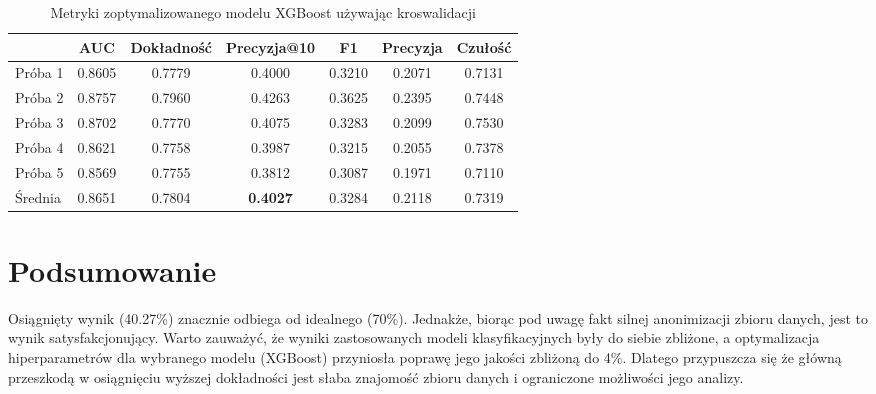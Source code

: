 \documentclass[a4paper,12pt]{article}
\begin{document}

    \begin{table}
        \hspace*{1cm}
        \begin{tabular}{l|*{6}{c}}
            & AUC & Dokładność & Precyzja@10 & F1 & Precyzja & Czułość \\
            \hline
            Próba 1 & 0.8605 & 0.7779 & 0.4000 & 0.3210 & 0.2071 & 0.7131 \\
            Próba 2 & 0.8757 & 0.7960 & 0.4263 & 0.3625 & 0.2395 & 0.7448 \\
            Próba 3 & 0.8702 & 0.7770 & 0.4075 & 0.3283 & 0.2099 & 0.7530 \\
            Próba 4 & 0.8621 & 0.7758 & 0.3987 & 0.3215 & 0.2055 & 0.7378 \\
            Próba 5 & 0.8569 & 0.7755 & 0.3812 & 0.3087 & 0.1971 & 0.7110 \\
            \hline
            Średnia & 0.8651 & 0.7804 & \textbf{0.4027} & 0.3284 & 0.2118 & 0.7319 \\
        \end{tabular}
        \caption{Metryki zoptymalizowanego modelu XGBoost używając kroswalidacji}
        \label{tab:xgb-score-comparison}
    \end{table}

    \section{Podsumowanie}
    Osiągnięty wynik (40.27\%) znacznie odbiega od idealnego (70\%).
    Jednakże, biorąc pod uwagę fakt silnej anonimizacji zbioru danych, jest to wynik satysfakcjonujący.
    Warto zauważyć, że wyniki zastosowanych modeli klasyfikacyjnych były do siebie zbliżone, a optymalizacja hiperparametrów dla wybranego modelu (XGBoost) przyniosła poprawę jego jakości zbliżoną do 4\%.
    Dlatego przypuszcza się że główną przeszkodą w osiągnięciu wyższej dokładności jest słaba znajomość zbioru danych i ograniczone możliwości jego analizy.

    
    
\end{document}
